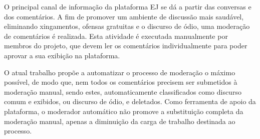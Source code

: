O principal canal de informação da plataforma EJ se dá a partir das conversas e dos comentários. A fim de promover um ambiente de discussão mais saudável, eliminando xingamentos, ofensas gratuitas e o discurso de ódio, uma moderação de comentários é realizada. Esta atividade é executada manualmente por membros do projeto, que devem ler os comentários individualmente para poder aprovar a sua exibição na plataforma.

O atual trabalho propõe a automatizar o processo de moderação o máximo possível, de modo que, nem todos os comentários precisem ser submetidos à moderação manual, sendo estes, automaticamente classificados como discurso comum e exibidos, ou discurso de ódio, e deletados. Como ferramenta de apoio da plataforma, o moderador automático não promove a substituição completa da moderação manual, apenas a diminuição da carga de trabalho destinada ao processo.
